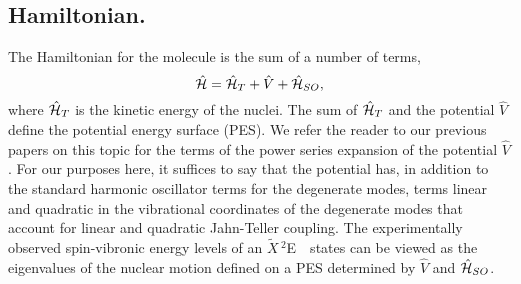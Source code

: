 \documentclass{article}
\newcommand{\XtildeE}{$\widetilde{X}\,^2$E\ }
\begin{document}
\subsection{Hamiltonian.} The Hamiltonian for the molecule is the sum of a number of terms, 
\begin{equation}
\hat{\cal H}=\hat{\cal H}_{T}+\hat{V}+\hat{\cal H}_{SO},
\label{overall Hamiltonian}
\end{equation}
where $\hat{\cal H}_{T}$ is the kinetic energy of the nuclei. 
The sum of $\hat{\cal H}_T$ and the potential $\hat{V}$ define
the potential energy surface (PES). We refer the reader to our 
previous papers\cite{c6f6review,barckholtz} on this topic for the
terms of the power series expansion of the potential 
$\hat{V}$. For our
purposes here, it suffices to say that the potential has, in addition
to the standard harmonic oscillator terms for the degenerate modes,
terms linear and quadratic in the vibrational coordinates of the
degenerate modes that account
for linear and quadratic Jahn-Teller coupling. 
The experimentally observed spin-vibronic energy levels of an \XtildeE\
states can be viewed as the eigenvalues of the nuclear
motion defined on a PES determined by $\hat{V}$ and $\hat{\cal H}_{SO}$.
\end{document}

